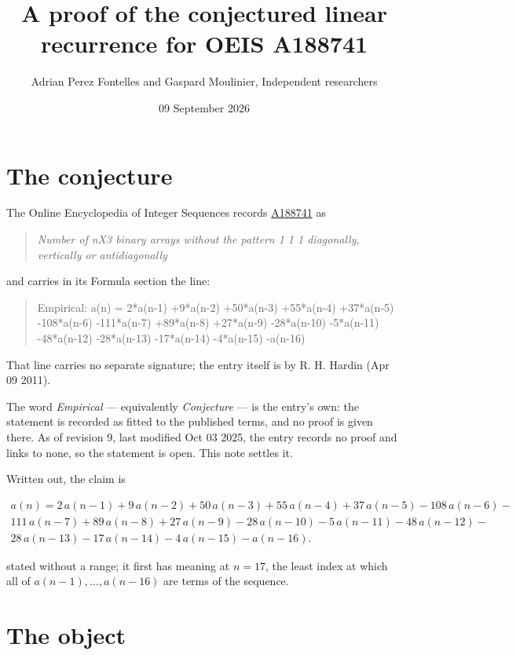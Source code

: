 \documentclass[11pt]{article}
\title{A proof of the conjectured linear recurrence for OEIS A188741}
\author{Adrian Perez Fontelles and Gaspard Moulinier, Independent researchers}
\date{09 September 2026}
\theoremstyle{definition}
\begin{document}
\maketitle
\section{The conjecture}

The Online Encyclopedia of Integer Sequences records \href{https://oeis.org/A188741}{A188741} as

\begin{quote}\itshape Number of nX3 binary arrays without the pattern 1 1 1 diagonally, vertically or antidiagonally\end{quote}

and carries in its Formula section the line:

\begin{quote}\ttfamily Empirical: a(n) = 2*a(n-1) +9*a(n-2) +50*a(n-3) +55*a(n-4) +37*a(n-5) -108*a(n-6) -111*a(n-7) +89*a(n-8) +27*a(n-9) -28*a(n-10) -5*a(n-11) -48*a(n-12) -28*a(n-13) -17*a(n-14) -4*a(n-15) -a(n-16)\end{quote}

That line carries no separate signature; the entry itself is by R. H. Hardin (Apr 09 2011).

The word {\itshape Empirical} --- equivalently {\itshape Conjecture} --- is the entry's own: the statement is recorded as fitted to the published terms, and no proof is given there. As of revision 9, last modified Oct 03 2025, the entry records no proof and links to none, so the statement is open. This note settles it.

Written out, the claim is

\begin{multline*} a(n) = 2\,a(n-1) + 9\,a(n-2) + 50\,a(n-3) + 55\,a(n-4) + 37\,a(n-5) - 108\,a(n-6) - \\ 111\,a(n-7) + 89\,a(n-8) + 27\,a(n-9) - 28\,a(n-10) - 5\,a(n-11) - 48\,a(n-12) - \\ 28\,a(n-13) - 17\,a(n-14) - 4\,a(n-15) - a(n-16). \end{multline*}

stated without a range; it first has meaning at $n = 17$, the least index at which all of $a(n-1),\dots,a(n-16)$ are terms of the sequence.

\section{The object}
\end{document}
